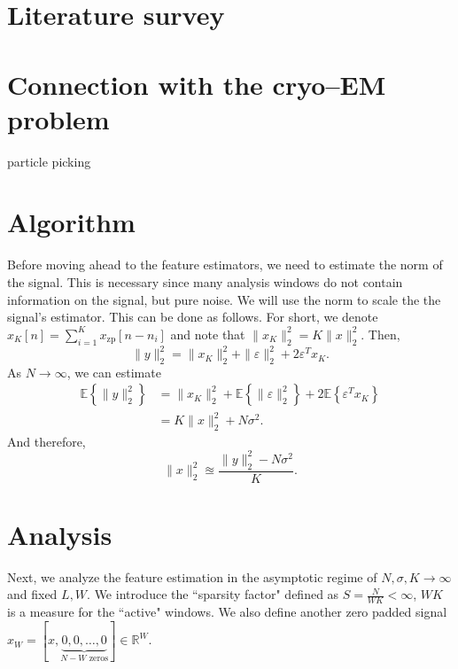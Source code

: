 \documentclass[12pt,a4paper]{article}
\numberwithin{equation}{section}
\numberwithin{figure}{section}
\theoremstyle{plain}
\theoremstyle{definition}
\theoremstyle{remark}
\theoremstyle{plain}
\theoremstyle{remark}
\theoremstyle{plain}
\theoremstyle{plain}
\newcommand{\E}[1]{\mathbb{E}\left\{{#1} \right\}}
\newcommand{\xz}{x_{\textrm{zp}}}
\begin{document}
\section{Literature survey} \label{sec:literature}


\section{Connection with the cryo--EM problem} \label{sec:cryoEM}
particle picking 

\section{Algorithm} \label{sec:algorithm}


Before moving ahead to the feature estimators, we need to estimate the norm of the signal. This is necessary since many analysis windows do not contain information on the signal, but pure noise. We will use the norm to scale the the signal's estimator.
This can be done as follows. For short, we denote $x_K[n]=\sum_{i=1}^K \xz[n-n_i]$ and note that $\|x_K\|_2^2 = K\|x\|_2^2$. 
Then,
\begin{equation}
\| y\|_2^2 =  \| x_K\|_2^2 + \|\varepsilon\|_2^2 + 2\varepsilon^Tx_K. 
\end{equation}  
As $N\to\infty$, we can estimate 
\begin{equation}
\begin{split}
\E{\| y\|_2^2} &=  \| x_K\|_2^2 + \E{\|\varepsilon\|_2^2} + 2\E{\varepsilon^Tx_K} \\ 
&= K\|x\|_2^2 + N\sigma^2. 
\end{split}	 
\end{equation}   
And therefore, 
\begin{equation}
\|x\|_2^2 \approxeq \frac{\| y\|_2^2 - N\sigma^2}{K}. 
\end{equation}


\section{Analysis} \label{sec:analysis}


Next, we analyze the feature estimation in the asymptotic regime of $N,\sigma,K\to\infty$ and fixed $L,W$. We introduce the ``sparsity factor" defined as $S = \frac{N}{WK}<\infty$, $WK$ is a measure for the ``active" windows. We also define  another zero padded signal $x_W  = [x, \underbrace{0,0,\ldots,0}_{N-W \text{ zeros}}]\in\mathbb{R}^W$.
\end{document}
